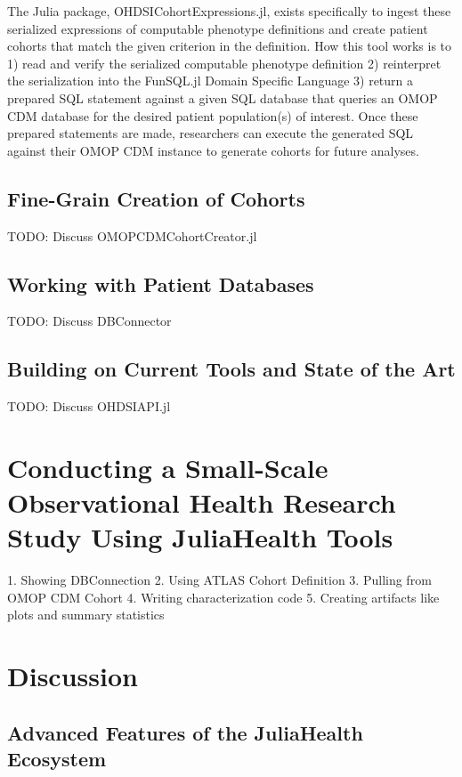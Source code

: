 \documentclass{juliacon}
\begin{document}
The Julia package, OHDSICohortExpressions.jl, exists specifically to ingest these serialized expressions of computable phenotype definitions and create patient cohorts that match the given criterion in the definition.
How this tool works is to 1) read and verify the serialized computable phenotype definition 2) reinterpret the serialization into the FunSQL.jl Domain Specific Language 3) return a prepared SQL statement against a given SQL database that queries an OMOP CDM database for the desired patient population(s) of interest.
Once these prepared statements are made, researchers can execute the generated SQL against their OMOP CDM instance to generate cohorts for future analyses.

\subsection{Fine-Grain Creation of Cohorts}

TODO: Discuss OMOPCDMCohortCreator.jl

\subsection{Working with Patient Databases}

TODO: Discuss DBConnector

\subsection{Building on Current Tools and State of the Art}

TODO: Discuss OHDSIAPI.jl

\section{Conducting a Small-Scale Observational Health Research Study Using JuliaHealth Tools}

  1. Showing DBConnection
  2. Using ATLAS Cohort Definition
  3. Pulling from OMOP CDM Cohort
  4. Writing characterization code
  5. Creating artifacts like plots and summary statistics

\section{Discussion}

\subsection{Advanced Features of the JuliaHealth Ecosystem}
\end{document}
